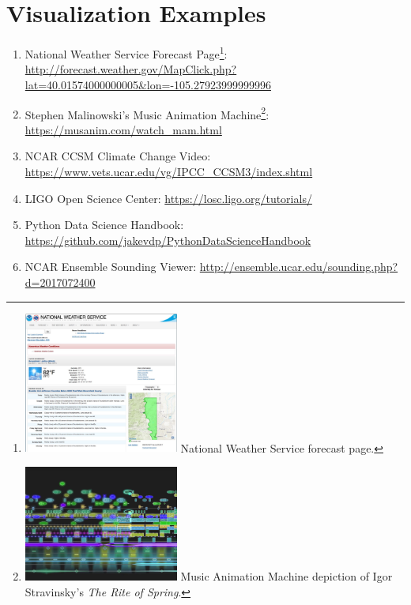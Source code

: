\documentclass{tufte-handout}
\begin{document}
\section{Visualization Examples}
\begin{enumerate}
\item National Weather Service Forecast Page\footnote{\includegraphics[width=2in]{nws_page.jpg} National Weather Service forecast page.}: \url{http://forecast.weather.gov/MapClick.php?lat=40.01574000000005&lon=-105.27923999999996
}
\item{Stephen Malinowski's Music Animation Machine\footnote{
\includegraphics[width=2in]{rite_of_spring.jpg}
Music Animation Machine depiction of Igor Stravinsky's \textit{The Rite of Spring}.}: \url{https://musanim.com/watch_mam.html}}
\item{NCAR CCSM Climate Change Video: \url{https://www.vets.ucar.edu/vg/IPCC_CCSM3/index.shtml}}
\item{LIGO Open Science Center: \url{https://losc.ligo.org/tutorials/}}
\item{Python Data Science Handbook: \url{https://github.com/jakevdp/PythonDataScienceHandbook}}
\item{NCAR Ensemble Sounding Viewer: \url{http://ensemble.ucar.edu/sounding.php?d=2017072400}}
\end{enumerate}
\end{document}
